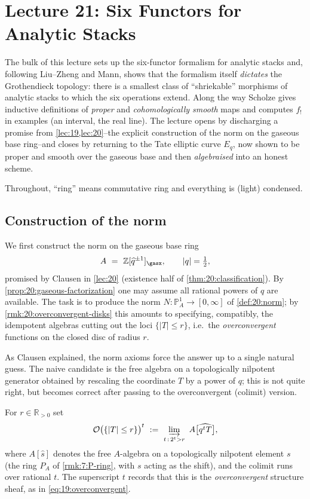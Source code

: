 \section{Lecture 21: Six Functors for Analytic Stacks}
\label{lec:21}

The bulk of this lecture sets up the six-functor formalism for analytic stacks
and, following Liu--Zheng and Mann, shows that the formalism itself \emph{dictates}
the Grothendieck topology: there is a smallest class of ``shriekable'' morphisms
of analytic stacks to which the six operations extend. Along the way Scholze
gives inductive definitions of \emph{proper} and \emph{cohomologically smooth}
maps and computes $f_!$ in examples (an interval, the real line). The lecture
opens by discharging a promise from \cref{lec:19,lec:20}--the explicit
construction of the norm on the gaseous base ring--and closes by returning to
the Tate elliptic curve $E_q$, now shown to be proper and smooth over the
gaseous base and then \emph{algebraised} into an honest scheme.

Throughout, ``ring'' means commutative ring and everything is (light) condensed.

\subsection{Construction of the norm}
\label{subsec:21:norm}

We first construct the norm on the gaseous base ring
\begin{equation*}
A\ =\ \mathbb Z[\widehat q^{\pm1}]_{\gasx},\qquad |q|=\tfrac12,
\end{equation*}
promised by Clausen in \cref{lec:20} (existence half of
\cref{thm:20:classification}). By \cref{prop:20:gaseous-factorization} one may
assume all rational powers of $q$ are available. The task is to produce the norm
$N\colon\mathbb P^1_A\to[0,\infty]$ of \cref{def:20:norm}; by
\cref{rmk:20:overconvergent-disks} this amounts to specifying, compatibly, the
idempotent algebras cutting out the loci $\{|T|\le r\}$, i.e.\ the
\emph{overconvergent} functions on the closed disc of radius $r$.

As Clausen explained, the norm axioms force the answer up to a single natural
guess. The naive candidate is the free algebra on a topologically nilpotent
generator obtained by rescaling the coordinate $T$ by a power of $q$; this is
not quite right, but becomes correct after passing to the overconvergent
(colimit) version.

\begin{definition}
\label{def:21:overconvergent-disc}
For $r\in\mathbb R_{>0}$ set
\begin{equation*}
\mathcal O\bigl(\{|T|\le r\}\bigr)^{t}\ :=\
\varinjlim_{t\,:\,2^{t}>r}\ A\bigl[\widehat{q^{t}T}\bigr],
\end{equation*}
where $A[\widehat{s}]$ denotes the free $A$-algebra on a topologically nilpotent
element $s$ (the ring $P_A$ of \cref{rmk:7:P-ring}, with $s$ acting as the shift),
and the colimit runs over rational $t$. The superscript $t$ records that this is
the \emph{overconvergent} structure sheaf, as in \cref{eq:19:overconvergent}.
\end{definition}

